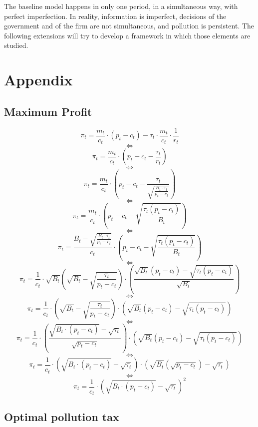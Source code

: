 \documentclass{article}
\begin{document}
The baseline model happens in only one period, in a simultaneous way, with perfect imperfection. In reality, information is imperfect, decisions of the government and of the firm are not simultaneous, and pollution is persistent. The following extensions will try to develop a framework in which those elements are studied.

\pagebreak
\section{Appendix}

\subsection{Maximum Profit}
\label{sec:proof1}
$$\pi_{t}= \frac{m_{t}}{c_{t}}\cdot\left(p_{t}-c_{t}\right)-\tau_{t}\cdot \frac{m_{t}}{c_{t}}\cdot \frac{1}{r_{t}}$$
$$\iff$$
$$\pi_{t}=\frac{m_{t}}{c_{t}}\cdot\left(p_{t}-c_{t}-\frac{\tau_{t}}{r_{t}}\right)$$
$$\iff$$
$$\pi_{t}=\frac{m_{t}}{c_{t}}\cdot\left(p_{t}-c_{t}-\frac{\tau_{t}}{\sqrt{\frac{B_{t}\cdot \tau_{t}}{p_{t}-c_{t}}}}\right)$$
$$\iff$$
$$\pi_{t}=\frac{m_{t}}{c_{t}}\cdot\left(p_{t}-c_{t}-\sqrt{\frac{\tau_{t}(p_{t}-c_{t})}{B_{t}}}\right)$$
$$\iff$$
$$\pi_{t}=\frac{B_{t}-\sqrt{\frac{B_{t}\cdot \tau_{t}}{p_{t}-c_{t}}}}{c_{t}}\cdot\left(p_{t}-c_{t}-\sqrt{\frac{\tau_{t}(p_{t}-c_{t})}{B_{t}}}\right)$$
$$\iff$$
$$\pi_{t}=\frac{1}{c_{t}}\cdot\sqrt{B_{t}}\left(\sqrt{B_{t}}-\sqrt{\frac{\tau_{t}}{p_{t}-c_{t}}}\right)\cdot\left(\frac{\sqrt{B_{t}}(p_{t}-c_{t})-\sqrt{\tau_{t}(p_{t}-c_{t})}}{\sqrt{B_{t}}}\right)$$
$$\iff$$
$$\pi_{t}=\frac{1}{c_{t}}\cdot\left(\sqrt{B_{t}}-\sqrt{\frac{\tau_{t}}{p_{t}-c_{t}}}\right)\cdot\left(\sqrt{B_{t}}(p_{t}-c_{t})-\sqrt{\tau_{t}(p_{t}-c_{t})}\right)$$
$$\iff$$
$$\pi_{t}=\frac{1}{c_{t}}\cdot\left(\frac{\sqrt{B_{t}\cdot (p_{t}-c_{t})}-\sqrt{\tau_{t}}}{\sqrt{p_{t}-c_{t}}}\right)\cdot\left(\sqrt{B_{t}}(p_{t}-c_{t})-\sqrt{\tau_{t}(p_{t}-c_{t})}\right)$$
$$\iff$$
$$\pi_{t}=\frac{1}{c_{t}}\cdot\left({\sqrt{B_{t}\cdot (p_{t}-c_{t})}-\sqrt{\tau_{t}}}\right)\cdot\left(\sqrt{B_{t}}(\sqrt{p_{t}-c_{t}})-\sqrt{\tau_{t}}\right)$$
$$\iff$$
\begin{equation}\tag{6}
    \pi_{t}=\frac{1}{c_{t}}\cdot\left({\sqrt{B_{t}\cdot (p_{t}-c_{t})}-\sqrt{\tau_{t}}}\right)^{2}
\end{equation}

\subsection{Optimal pollution tax}
\label{sec:proof2}
\end{document}
